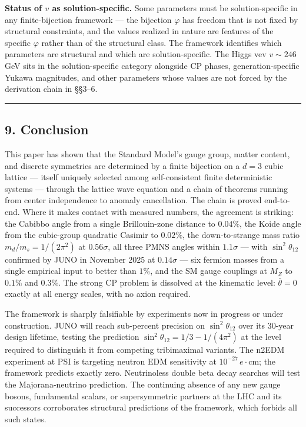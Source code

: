 \documentclass[
]{article}
\begin{document}
\textbf{Status of \(v\) as solution-specific.} Some parameters must be
solution-specific in any finite-bijection framework --- the bijection
\(\varphi\) has freedom that is not fixed by structural constraints, and
the values realized in nature are features of the specific \(\varphi\)
rather than of the structural class. The framework identifies which
parameters are structural and which are solution-specific. The Higgs vev
\(v \sim 246\) GeV sits in the solution-specific category alongside CP
phases, generation-specific Yukawa magnitudes, and other parameters
whose values are not forced by the derivation chain in §§3--6.

\begin{center}\rule{0.5\linewidth}{0.5pt}\end{center}

\hypertarget{conclusion}{%
\subsection{9. Conclusion}\label{conclusion}}

This paper has shown that the Standard Model's gauge group, matter
content, and discrete symmetries are determined by a finite bijection on
a \(d = 3\) cubic lattice --- itself uniquely selected among
self-consistent finite deterministic systems --- through the lattice
wave equation and a chain of theorems running from center independence
to anomaly cancellation. The chain is proved end-to-end. Where it makes
contact with measured numbers, the agreement is striking: the Cabibbo
angle from a single Brillouin-zone distance to \(0.04\%\), the Koide
angle from the cubic-group quadratic Casimir to \(0.02\%\), the
down-to-strange mass ratio \(m_d/m_s = 1/(2\pi^2)\) at \(0.56\sigma\),
all three PMNS angles within \(1.1\sigma\) --- with
\(\sin^2\theta_{12}\) confirmed by JUNO in November 2025 at
\(0.14\sigma\) --- six fermion masses from a single empirical input to
better than \(1\%\), and the SM gauge couplings at \(M_Z\) to \(0.1\%\)
and \(0.3\%\). The strong CP problem is dissolved at the kinematic
level: \(\bar\theta = 0\) exactly at all energy scales, with no axion
required.

The framework is sharply falsifiable by experiments now in progress or
under construction. JUNO will reach sub-percent precision on
\(\sin^2\theta_{12}\) over its 30-year design lifetime, testing the
prediction \(\sin^2\theta_{12} = 1/3 - 1/(4\pi^2)\) at the level
required to distinguish it from competing tribimaximal variants. The
n2EDM experiment at PSI is targeting neutron EDM sensitivity at
\(10^{-27}\,e\cdot\text{cm}\); the framework predicts exactly zero.
Neutrinoless double beta decay searches will test the Majorana-neutrino
prediction. The continuing absence of any new gauge bosons, fundamental
scalars, or supersymmetric partners at the LHC and its successors
corroborates structural predictions of the framework, which forbids all
such states.
\end{document}

